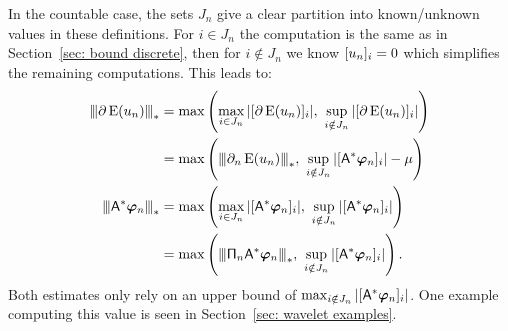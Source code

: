 \documentclass[smallextended]{svjour3}
\newcommand{\Norm}[1]{{\left\vert\kern-0.25ex\left\vert\kern-0.25ex\left\vert #1 \right\vert\kern-0.25ex\right\vert\kern-0.25ex\right\vert}}
\newcommand{\op}[1]{\operatorname{#1}}
\newcommand{\1}{\F{1}}
\newcommand*{\varf}[1]{%
	\IfEqCase{#1}{%
		{0}{u}%
		{1}{v}%
		{2}{w}%
	}[u#1]%
}
\newcommand*{\vard}[1]{%
	\IfEqCase{#1}{%
		{0}{\varphi}%
		{1}{\psi}%
	}[\varphi #1]%
}
\newcommand*{\vvard}[1]{\vec{\vard{#1}}}
\begin{document}
	In the countable case, the sets $J_n$ give a clear partition into known/unknown values in these definitions. For $i\in J_n$ the computation is the same as in Section~\ref{sec: bound discrete}, then for $i\notin J_n$ we know $[\varf0_n]_i=0$ which simplifies the remaining computations. This leads to:
	\begin{align}
		\Norm{\partial\op{E}(\varf0_n)}_* &= \max\left(\max_{i\in J_n}|[\partial\op{E}(\varf0_n)]_i|,\ \sup_{i\notin J_n} |[\partial\op{E}(\varf0_n)]_i|\right)
		\\&= \max\left(\Norm{\partial_n\op{E}(\varf0_n)}_*,\ \sup_{i\notin J_n} |[\A^*\vvard0_n]_i|-\mu\right)
		\\ \Norm{\A^*\vvard0_n}_* &= \max\left(\max_{i\in J_n}|[\A^*\vvard0_n]_i|,\ \sup_{i\notin J_n} |[\A^*\vvard0_n]_i|\right)
		\\ &= \max\left(\Norm{\tens{\Pi}_n\A^*\vvard0_n}_*,\ \sup_{i\notin J_n} |[\A^*\vvard0_n]_i|\right).
	\end{align}
	Both estimates only rely on an upper bound of $\max_{i\notin J_n} |[\A^*\vvard0_n]_i|$. One example computing this value is seen in Section~\ref{sec: wavelet examples}.
	
\end{document}
